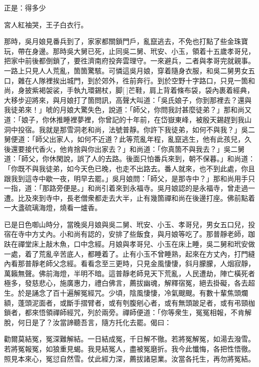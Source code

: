 正是：得多少

宮人紅袖哭，王子白衣行。

那時，吳月娘見番兵到了，家家都關鎖門戶，亂竄逃去，不免也打點了些金珠寶玩，帶在身邊。那時吳大舅已死，止同吳二舅、玳安、小玉，領着十五歲孝哥兒，把家中前後都倒鎖了，要徃濟南府投奔雲理守。一來避兵，二者與孝哥完就親事。一路上只見人人荒亂，箇箇驚駭。可憐這吳月娘，穿着隨身衣服，和吳二舅男女五口，雜在人隊裡挨出城門，到於郊外，徃前奔行。到於空野十字路口，只見一箇和尚，身披紫褐袈裟，手執九環錫杖，脚[]芒鞋，肩上背着條布袋，袋內裹着經典，大移步迎將來，與月娘打了箇問訊，高聲大叫道：「吳氏娘子，你到那裡去？還與我徒弟來！」唬的月娘大驚失色，說道：「師父，你問我討甚麼徒弟？」那和尚又道：「娘子，你休推睡裡夢裡，你曾記的十年前，在岱嶽東峰，被殷天錫趕到我山洞中投宿。我就是那雪洞老和尚，法號普靜。你許下我徒弟，如何不與我？」吳二舅便道：「師父出家人，如何不近道？此等荒亂年程，亂竄逃生，他有此孩兒，久後還要接代香火，他肯捨與你出家去？」和尚道：「你真箇不與我去？」吳二舅道：「師父，你休閑說，誤了人的去路。後面只怕番兵來到，朝不保暮。」和尚道：「你既不與我徒弟，如今天色已晚，也走不出路去。番人就來，也不到此處，你且跟我到這寺中歇一夜，明早去罷。」吳月娘問：「師父，是那寺中？」那和尚用手只一指，道：「那路旁便是。」和尚引着來到永福寺。吳月娘認的是永福寺，曾走過一遭。比及來到寺中，長老僧衆都走去大半，止有幾箇禪和尚在後邊打座。佛前點着一大盞硫璃海燈，燒看一爐香。

已是日色啣山時分，當晚吳月娘與吳二舅、玳安、小玉、孝哥兒，男女五口兒，投宿在寺中方丈內。小和尚有認的，安排了些飯食，與月娘等吃了。那普靜老師，跏趺在禪堂床上敲木魚，口中念經。月娘與孝哥兒、小玉在床上睡，吳二舅和玳安做一處，着了荒亂辛苦底人，都睡着了。止有小玉不曾睡熟，起來在方丈內，打門縫內看那普靜老師父念經。看看念至三更時，只見金風悽悽，斜月朦朦，人烟寂靜，萬籟無聲。佛前海燈，半明不暗。這普靜老師見天下荒亂，人民遭劫，陣亡橫死者極多，發慈悲心，施廣惠力，禮白佛言，薦拔幽魂，解釋宿冤，絕去掛礙，各去超生。於是誦念了百十遍解冤經咒。少頃，陰風悽悽，冷氣颼颼。有數十輩焦頭爛額，蓬頭泥面者，或斷手摺臂者，或有刳腹剜心者，或有無頭跛足者，或有弔頸枷鎖者，都來悟領禪師經咒，列於兩旁。禪師便道：「你等衆生，冤冤相報，不肯解脫，何日是了？汝當諦聽吾言，隨方托化去罷。偈曰：

勸爾莫結冤，冤深難解結。一日結成冤，千日解不徹。若將冤解冤，如湯去潑雪。若將冤報冤，如狼重見蝎。我見結冤人，盡被冤磨折。我今此懺悔，各把性悟徹。照見本來心，冤愆自然雪。仗此經力深，薦拔諸惡業。汝當各托生，再勿將冤結。{}


